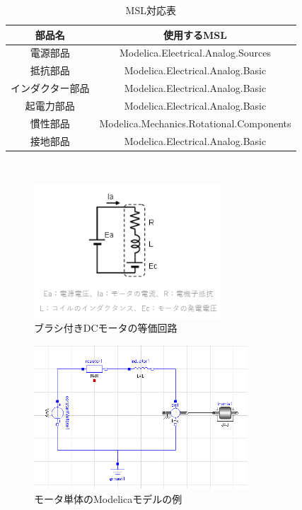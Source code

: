\begin{table}[t]
	\centering
	\caption{MSL対応表}
	\begin{tabular}{|c|c|} \hline
	  部品名 & 使用するMSL \\ \hline \hline
	  電源部品 & Modelica.Electrical.Analog.Sources \\ \hline
	  抵抗部品 & Modelica.Electrical.Analog.Basic \\ \hline
	  インダクター部品 & Modelica.Electrical.Analog.Basic \\ \hline
	  起電力部品 & Modelica.Electrical.Analog.Basic \\ \hline
	  慣性部品 & Modelica.Mechanics.Rotational.Components \\ \hline
	  接地部品 & Modelica.Electrical.Analog.Basic \\ \hline
	\end{tabular}
	\label{tab:MSL}
  \end{table}
　
\begin{figure}[t]
	\centering
	\includegraphics[width=7cm]{./Image/touka.png}
	\caption{ブラシ付きDCモータの等価回路}
	\label{fig:touka}
  \end{figure}

\begin{figure}[t]
  \centering
  \includegraphics[width=8cm]{./Image/tantai_model.png}
  \caption{モータ単体のModelicaモデルの例}
  \label{fig:tantai_model}
\end{figure}

